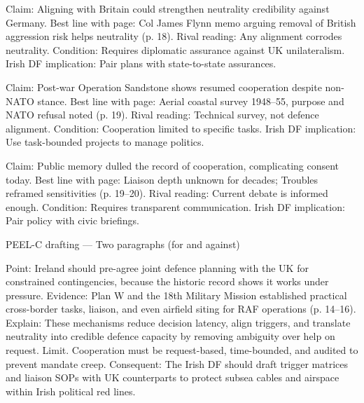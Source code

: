 Claim: Aligning with Britain could strengthen neutrality credibility against Germany.
Best line with page: Col James Flynn memo arguing removal of British aggression risk helps neutrality (p. 18).
Rival reading: Any alignment corrodes neutrality.
Condition: Requires diplomatic assurance against UK unilateralism.
Irish DF implication: Pair plans with state-to-state assurances.

Claim: Post-war Operation Sandstone shows resumed cooperation despite non-NATO stance.
Best line with page: Aerial coastal survey 1948–55, purpose and NATO refusal noted (p. 19).
Rival reading: Technical survey, not defence alignment.
Condition: Cooperation limited to specific tasks.
Irish DF implication: Use task-bounded projects to manage politics.

Claim: Public memory dulled the record of cooperation, complicating consent today.
Best line with page: Liaison depth unknown for decades; Troubles reframed sensitivities (p. 19–20).
Rival reading: Current debate is informed enough.
Condition: Requires transparent communication.
Irish DF implication: Pair policy with civic briefings.

PEEL-C drafting — Two paragraphs (for and against)

Point: Ireland should pre-agree joint defence planning with the UK for constrained contingencies, because the historic record shows it works under pressure.
Evidence: Plan W and the 18th Military Mission established practical cross-border tasks, liaison, and even airfield siting for RAF operations (p. 14–16).
Explain: These mechanisms reduce decision latency, align triggers, and translate neutrality into credible defence capacity by removing ambiguity over help on request.
Limit. Cooperation must be request-based, time-bounded, and audited to prevent mandate creep.
Consequent: The Irish DF should draft trigger matrices and liaison SOPs with UK counterparts to protect subsea cables and airspace within Irish political red lines.

